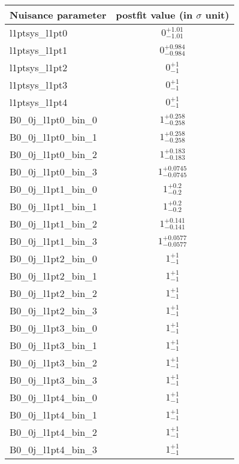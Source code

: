 
\begin{tabular}{|l|c|}
\hline
Nuisance parameter & postfit value (in $\sigma$ unit) \\\hline
l1ptsys\_l1pt0 & $0^{+1.01}_{-1.01}$ \\
l1ptsys\_l1pt1 & $0^{+0.984}_{-0.984}$ \\
l1ptsys\_l1pt2 & $0^{+1}_{-1}$ \\
l1ptsys\_l1pt3 & $0^{+1}_{-1}$ \\
l1ptsys\_l1pt4 & $0^{+1}_{-1}$ \\
B0\_0j\_l1pt0\_bin\_0 & $1^{+0.258}_{-0.258}$ \\
B0\_0j\_l1pt0\_bin\_1 & $1^{+0.258}_{-0.258}$ \\
B0\_0j\_l1pt0\_bin\_2 & $1^{+0.183}_{-0.183}$ \\
B0\_0j\_l1pt0\_bin\_3 & $1^{+0.0745}_{-0.0745}$ \\
B0\_0j\_l1pt1\_bin\_0 & $1^{+0.2}_{-0.2}$ \\
B0\_0j\_l1pt1\_bin\_1 & $1^{+0.2}_{-0.2}$ \\
B0\_0j\_l1pt1\_bin\_2 & $1^{+0.141}_{-0.141}$ \\
B0\_0j\_l1pt1\_bin\_3 & $1^{+0.0577}_{-0.0577}$ \\
B0\_0j\_l1pt2\_bin\_0 & $1^{+1}_{-1}$ \\
B0\_0j\_l1pt2\_bin\_1 & $1^{+1}_{-1}$ \\
B0\_0j\_l1pt2\_bin\_2 & $1^{+1}_{-1}$ \\
B0\_0j\_l1pt2\_bin\_3 & $1^{+1}_{-1}$ \\
B0\_0j\_l1pt3\_bin\_0 & $1^{+1}_{-1}$ \\
B0\_0j\_l1pt3\_bin\_1 & $1^{+1}_{-1}$ \\
B0\_0j\_l1pt3\_bin\_2 & $1^{+1}_{-1}$ \\
B0\_0j\_l1pt3\_bin\_3 & $1^{+1}_{-1}$ \\
B0\_0j\_l1pt4\_bin\_0 & $1^{+1}_{-1}$ \\
B0\_0j\_l1pt4\_bin\_1 & $1^{+1}_{-1}$ \\
B0\_0j\_l1pt4\_bin\_2 & $1^{+1}_{-1}$ \\
B0\_0j\_l1pt4\_bin\_3 & $1^{+1}_{-1}$ \\
\hline
\end{tabular}
